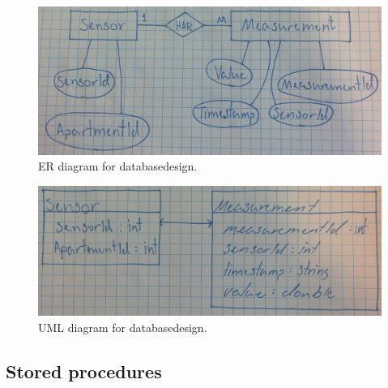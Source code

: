 \begin{figure}[h]
	\centering
	\includegraphics[width=0.8\linewidth]{figs/erdiagram}
	\caption{ER diagram for databasedesign.}
	\label{fig:erdiagram}
\end{figure}

\begin{figure}[h]
	\centering
	\includegraphics[width=0.8\linewidth]{figs/umldiagram}
	\caption{UML diagram for databasedesign.}
	\label{fig:umldiagram}
\end{figure}

\subsection{Stored procedures}

